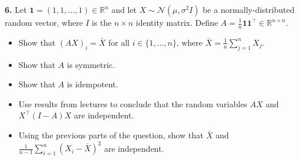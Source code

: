 \documentclass[
  a4paper,
]{article}
\theoremstyle{definition}
\theoremstyle{definition}
\theoremstyle{definition}
\theoremstyle{definition}
\theoremstyle{remark}
\begin{document}
\textbf{6.} Let \(\mathbf{1} = (1, 1, \ldots, 1) \in\mathbb{R}^n\) and let \(X \sim \mathcal{N}(\mu,
\sigma^2 I)\) be a normally-distributed random vector, where \(I\) is the
\(n\times n\) identity matrix. Define \(A = \frac1n
\mathbf{1} \mathbf{1}^\top \in \mathbb{R}^{n\times n}\).

\begin{itemize}
\item
  Show that \((AX)_i = \bar X\) for all \(i \in \{1, \ldots, n\}\),
  where \(\bar X = \frac1n \sum_{j=1}^n X_j\).
\item
  Show that \(A\) is symmetric.
\item
  Show that \(A\) is idempotent.
\item
  Use results from lectures to conclude that the random
  variables \(AX\) and \(X^\top (I-A)X\) are independent.
\item
  Using the previous parts of the question, show that \(\bar X\)
  and \(\frac{1}{n-1} \sum_{i=1}^n (X_i - \bar X)^2\) are independent.
\end{itemize}
\end{document}
